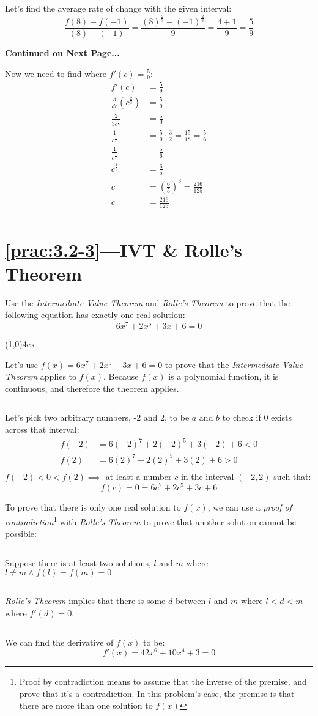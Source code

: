 \documentclass{MathNotes}
\newcommand{\br}{
\begin{center}
\line(1,0){4ex}
\end{center}}
\newcommand{\continued}{
\mbox{}
\vfill
\textbf{Continued on Next Page...}\newpage
}
\newcommand{\bl}{
    \newline$ $\newline
}
\begin{document}
Let's find the average rate of change with the given interval:
\begin{displaymath}
    \frac{f(8)-f(-1)}{(8)-(-1)}=\frac{(8)^{\frac{2}{3}}-(-1)^{\frac{2}{3}}}{9}
    =\frac{4+1}{9}=\frac{5}{9}
\end{displaymath}
\continued
Now we need to find where $f'(c)=\frac{5}{9}$:
\begin{align*}
    f'(c)&=\frac{5}{9}\\
    \frac{d}{dc}(c^\frac{2}{3})&=\frac{5}{9}\\
    \frac{2}{3c^{\frac{1}{3}}}&=\frac{5}{9}\\
    \frac{1}{c^{\frac{1}{3}}}&=\frac{5}{9}\cdot\frac{3}{2}=\frac{15}{18}=\frac{5}{6}\\
    \frac{1}{c^{\frac{1}{3}}}&=\frac{5}{6}\\
    c^{\frac{1}{3}}&=\frac{6}{5}\\
    c&=(\frac{6}{5})^3=\frac{216}{125}\\
    c&=\frac{216}{125}\\
\end{align*}

\section*{\ref{prac:3.2-3}---IVT \& Rolle's Theorem}\label{ans:3.2-3}
Use the \textit{Intermediate Value Theorem} and \textit{Rolle's Theorem} to
prove that the following equation has exactly one real solution:
$$6x^7+2x^5+3x+6=0$$
\br
Let's use $f(x)=6x^7+2x^5+3x+6=0$ to prove that the \textit{Intermediate
Value Theorem} applies to $f(x)$. Because $f(x)$ is a polynomial function, it
is continuous, and therefore the theorem applies.
\bl
Let's pick two arbitrary numbers, -2 and 2, to be $a$ and $b$ to check if $0$ exists
across that interval:
\begin{align*}
    f(-2)&=6(-2)^7+2(-2)^5+3(-2)+6 < 0\\
    f(2)&=6(2)^7+2(2)^5+3(2)+6 > 0\\
\end{align*}
$f(-2)<0<f(2)\implies$ at least a number $c$ in the interval $(-2, 2)$ such
that: $$f(c)=0=6c^7+2c^5+3c+6$$

To prove that there is only one real solution to $f(x)$, we can use a
\textit{proof of contradiction}\footnote{Proof by contradiction means to assume
that the inverse of the premise, and prove that it's a contradiction. In this
problem's case, the premise is that there are more than one solution to $f(x)$}
with \textit{Rolle's Theorem} to prove that
another solution cannot be possible:
\bl
{}
Suppose there is at least two solutions, $l$ and $m$ where 
$l\neq m\land f(l)=f(m)=0$
\bl
\textit{Rolle's Theorem} implies that there is some $d$ between $l$ and $m$
where $l<d<m$ where $f'(d)=0$.
\bl
We can find the derivative of $f(x)$ to be:
$$f'(x)=42x^6+10x^4+3=0$$
\end{document}
